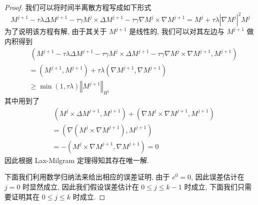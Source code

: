 \documentclass[UTF8,a4paper]{article}
\begin{document}
\begin{proof}
  我们可以将时间半离散方程写成如下形式
\begin{equation*}
M^{j+1}-\tau\lambda\Delta M^{j+1}-\tau\gamma M^j\times\Delta M^{j+1}-\tau\gamma\nabla M^j\times\nabla M^{j+1}=M^j+\tau\lambda \left| \nabla M^j \right|^2M^j
\end{equation*}
为了说明该方程有解, 由于其关于 $M^{j+1}$ 是线性的, 我们可以对其左边与 $M^{j+1}$ 做内积得到
\begin{align*}
  &\ (M^{j+1}-\tau\lambda\Delta M^{j+1}-\tau\gamma M^j\times \Delta M^{j+1}-\tau\gamma\nabla M^j\times\nabla M^{j+1},M^{j+1})\\
  &=(M^{j+1},M^{j+1})+\tau\lambda(\nabla M^{j+1},\nabla M^{j+1})\\
  &\geq\min(1,\tau\lambda)\left\Vert M^{j+1}\right\Vert_{H^1}
\end{align*}
其中用到了
\begin{align*}
  &\ (M^j\times \Delta M^{j+1},M^{j+1})+(\nabla M^j\times\nabla M^{j+1},M^{j+1})\\
  &=(\nabla(M^j\times\nabla M^{j+1}),M^{j+1})\\
  &=-(M^j\times\nabla M^{j+1},\nabla M^{j+1})=0
\end{align*}
因此根据 Lax-Milgram 定理得知其存在唯一解.

下面我们利用数学归纳法来给出相应的误差证明, 由于 $e^0=0$, 因此误差估计在 $j=0$ 时显然成立, 因此我们假设误差估计在 $0\leq j\leq k-1$ 时成立, 下面我们只需要证明其在 $0\leq j\leq k$ 时成立.


\end{proof}
\end{document}
